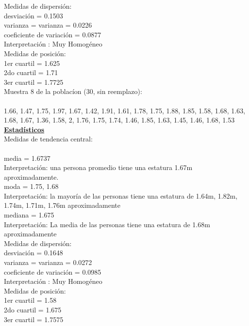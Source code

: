 \documentclass[a4paper,12pt]{article}
\begin{document}
\begin{enumerate}
Medidas de dispersi\'on:\\
desviaci\'on = 0.1503\\
varianza = varianza = 0.0226\\
coeficiente de variaci\'on = 0.0877\\
Interpretaci\'on : Muy Homog\'eneo\\

Medidas de posici\'on:\\
1er cuartil = 1.625\\
2do cuartil = 1.71\\
3er cuartil = 1.7725\\

Muestra 8 de la poblac\'ion (30, sin reemplazo): \\\\
1.66,	1.47,	1.75,	1.97,	1.67,	1.42,
1.91,	1.61,	1.78,	1.75,	1.88,	1.85,
1.58,	1.68,	1.63,	1.68,	1.67,	1.36,
1.58,	2,      1.76,	1.75,	1.74,	1.46,
1.85,	1.63,	1.45,	1.46,	1.68,	1.53\\

\textbf{\underline{Estad\'isticos}}\\

Medidas de tendencia central:\\\\
media = 1.6737\\
Interpretaci\'on: una persona promedio tiene una estatura 1.67m aproximadamente.\\
moda = 1.75, 1.68\\
Interpretaci\'on: la mayor\'ia de las personas tiene una estatura de 1.64m, 1.82m, 1.74m, 1.71m, 1.76m aproximadamente\\
mediana = 1.675\\
Interpretaci\'on: La media de las personas tiene una estatura de 1.68m aproximadamente\\

Medidas de dispersi\'on:\\
desviaci\'on = 0.1648\\
varianza = varianza = 0.0272\\
coeficiente de variaci\'on = 0.0985\\
Interpretaci\'on : Muy Homog\'eneo\\

Medidas de posici\'on:\\
1er cuartil = 1.58\\
2do cuartil = 1.675\\
3er cuartil = 1.7575\\


\end{enumerate}
\end{document}
